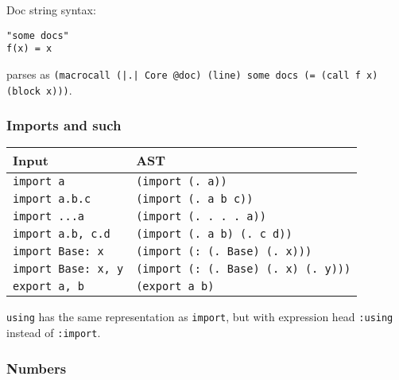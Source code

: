 Doc string syntax:




\begin{verbatim}
"some docs"
f(x) = x
\end{verbatim}



parses as \texttt{(macrocall (|.| Core {\textquotesingle}@doc) (line) {\textquotedbl}some docs{\textquotedbl} (= (call f x) (block x)))}.



\hypertarget{13863161852089184826}{}


\subsubsection{Imports and such}




\begin{table}[h]

\begin{tabulary}{\linewidth}{|L|L|}
\hline
Input & AST \\
\hline
\texttt{import a} & \texttt{(import (. a))} \\
\hline
\texttt{import a.b.c} & \texttt{(import (. a b c))} \\
\hline
\texttt{import ...a} & \texttt{(import (. . . . a))} \\
\hline
\texttt{import a.b, c.d} & \texttt{(import (. a b) (. c d))} \\
\hline
\texttt{import Base: x} & \texttt{(import (: (. Base) (. x)))} \\
\hline
\texttt{import Base: x, y} & \texttt{(import (: (. Base) (. x) (. y)))} \\
\hline
\texttt{export a, b} & \texttt{(export a b)} \\
\hline
\end{tabulary}

\end{table}



\texttt{using} has the same representation as \texttt{import}, but with expression head \texttt{:using} instead of \texttt{:import}.



\hypertarget{13439801024488074381}{}


\subsubsection{Numbers}



